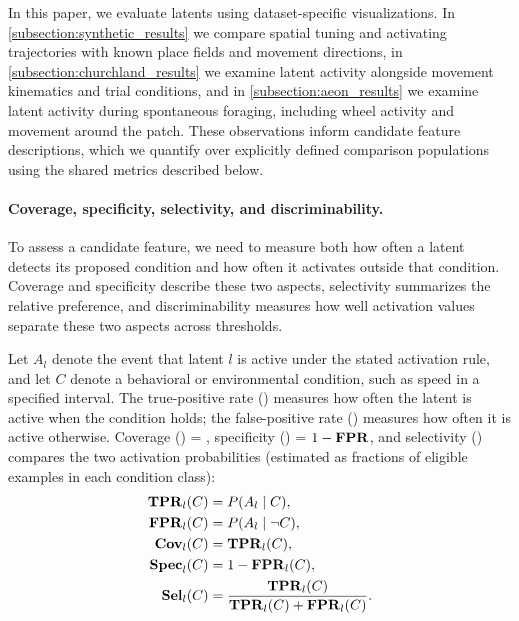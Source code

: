 In this paper, we evaluate latents using dataset-specific visualizations. In \hyperref[subsection:synthetic_results]{\ref*{subsection:synthetic_results}} we compare spatial tuning and activating trajectories with known place fields and movement directions, in \hyperref[subsection:churchland_results]{\ref*{subsection:churchland_results}} we examine latent activity alongside movement kinematics and trial conditions, and in \hyperref[subsection:aeon_results]{\ref*{subsection:aeon_results}} we examine latent activity during spontaneous foraging, including wheel activity and movement around the patch. These observations inform candidate feature descriptions, which we quantify over explicitly defined comparison populations using the shared metrics described below.

\paragraph{Coverage, specificity, selectivity, and discriminability.}
\label{subsection:selectivity_score}
To assess a candidate feature, we need to measure both how often a latent detects its proposed condition and how often it activates outside that condition. Coverage and specificity describe these two aspects, selectivity summarizes the relative preference, and discriminability measures how well activation values separate these two aspects across thresholds.

Let $A_l$ denote the event that latent $l$ is active under the stated activation rule, and let $C$ denote a behavioral or environmental condition, such as speed in a specified interval. The true-positive rate () measures how often the latent is active when the condition holds; the false-positive rate () measures how often it is active otherwise. Coverage () = , specificity () = $1 - \mathbf{FPR}$, and selectivity () compares the two activation probabilities (estimated as fractions of eligible examples in each condition class):
\begin{align}
\mathbf{TPR}_l(C) &= P(A_l\mid C),\notag\\
\mathbf{FPR}_l(C) &= P(A_l\mid\neg C),\notag\\
\mathbf{Cov}_l(C) &= \mathbf{TPR}_l(C),\label{eq:latent_coverage}\\
\mathbf{Spec}_l(C) &= 1-\mathbf{FPR}_l(C),\label{eq:latent_specificity}\\
\mathbf{Sel}_l(C) &= \frac{\mathbf{TPR}_l(C)}{\mathbf{TPR}_l(C)+\mathbf{FPR}_l(C)}.\label{eq:latent_selectivity}
\end{align}

